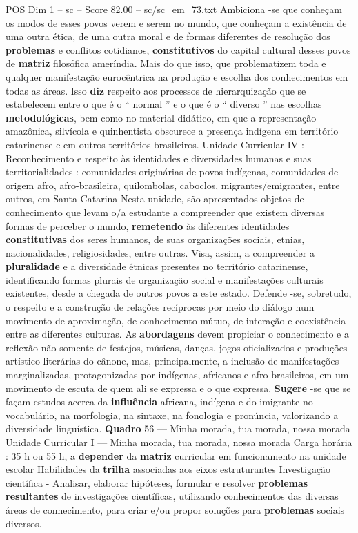 \begin{textsample}{POS Dim 1 – sc – Score 82.00 – sc/sc\_em\_73.txt}
Ambiciona -se que conheçam os modos de esses povos verem e serem no mundo, que conheçam a existência de uma outra ética, de uma outra moral e de formas diferentes de resolução dos \textbf{problemas} e conflitos cotidianos, \textbf{constitutivos} do capital cultural desses povos de \textbf{matriz} filosófica ameríndia.
Mais do que isso, que problematizem toda e qualquer manifestação eurocêntrica na produção e escolha dos conhecimentos em todas as áreas.
Isso \textbf{diz} respeito aos processos de hierarquização que se estabelecem entre o que é o “ normal ” e o que é o “ diverso ” nas escolhas \textbf{metodológicas}, bem como no material didático, em que a representação amazônica, silvícola e quinhentista obscurece a presença indígena em território catarinense e em outros territórios brasileiros.
Unidade Curricular IV : Reconhecimento e respeito às identidades e diversidades humanas e suas territorialidades : comunidades originárias de povos indígenas, comunidades de origem afro, afro-brasileira, quilombolas, caboclos, migrantes/emigrantes, entre outros, em Santa Catarina Nesta unidade, são apresentados objetos de conhecimento que levam o/a estudante a compreender que existem diversas formas de perceber o mundo, \textbf{remetendo} às diferentes identidades \textbf{constitutivas} dos seres humanos, de suas organizações sociais, etnias, nacionalidades, religiosidades, entre outras.
Visa, assim, a compreender a \textbf{pluralidade} e a diversidade étnicas presentes no território catarinense, identificando formas plurais de organização social e manifestações culturais existentes, desde a chegada de outros povos a este estado.
Defende -se, sobretudo, o respeito e a construção de relações recíprocas por meio do diálogo num movimento de aproximação, de conhecimento mútuo, de interação e coexistência entre as diferentes culturas.
As \textbf{abordagens} devem propiciar o conhecimento e a reflexão não somente de festejos, músicas, danças, jogos oficializados e produções artístico-literárias do cânone, mas, principalmente, a inclusão de manifestações marginalizadas, protagonizadas por indígenas, africanos e afro-brasileiros, em um movimento de escuta de quem ali se expressa e o que expressa. \textbf{Sugere} -se que se façam estudos acerca da \textbf{influência} africana, indígena e do imigrante no vocabulário, na morfologia, na sintaxe, na fonologia e pronúncia, valorizando a diversidade linguística. \textbf{Quadro} 56 — Minha morada, tua morada, nossa morada Unidade Curricular I — Minha morada, tua morada, nossa morada Carga horária : 35 h ou 55 h, a \textbf{depender} da \textbf{matriz} curricular em funcionamento na unidade escolar Habilidades da \textbf{trilha} associadas aos eixos estruturantes Investigação científica - Analisar, elaborar hipóteses, formular e resolver \textbf{problemas} \textbf{resultantes} de investigações científicas, utilizando conhecimentos das diversas áreas de conhecimento, para criar e/ou propor soluções para \textbf{problemas} sociais diversos.

\end{textsample}

